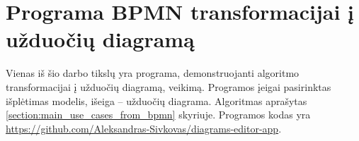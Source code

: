 \section{Programa BPMN transformacijai į užduočių diagramą}


Vienas iš šio darbo tikslų yra programa, demonstruojanti algoritmo \BPMN{} transformacijai į užduočių diagramą, veikimą. Programos įeigai pasirinktas \BPMN{} išplėtimas \DVCM{} modelis, išeiga – užduočių diagrama. Algoritmas aprašytas \ref{section:main_use_cases_from_bpmn} skyriuje. Programos kodas yra \href{https://github.com/Aleksandras-Sivkovas/diagrams-editor-app}{https://github.com/Aleksandras-Sivkovas/diagrams-editor-app}.



